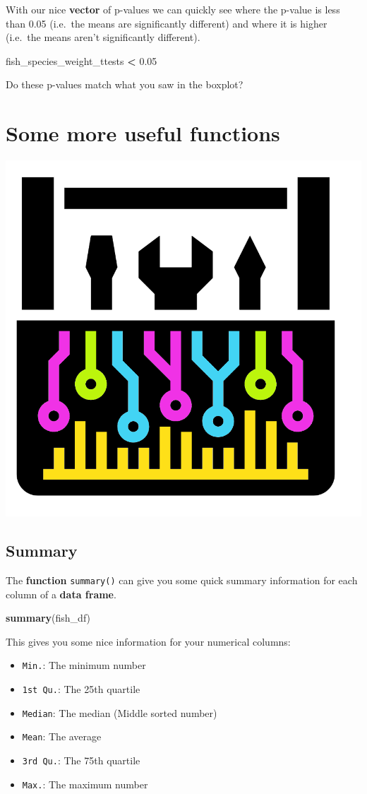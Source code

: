 \documentclass[]{book}
\newenvironment{Shaded}{\begin{snugshade}}{\end{snugshade}}
\newcommand{\KeywordTok}[1]{\textcolor[rgb]{0.13,0.29,0.53}{\textbf{#1}}}
\newcommand{\FloatTok}[1]{\textcolor[rgb]{0.00,0.00,0.81}{#1}}
\newcommand{\StringTok}[1]{\textcolor[rgb]{0.31,0.60,0.02}{#1}}
\newcommand{\OperatorTok}[1]{\textcolor[rgb]{0.81,0.36,0.00}{\textbf{#1}}}
\newcommand{\NormalTok}[1]{#1}
\providecommand{\tightlist}{%
  \setlength{\itemsep}{0pt}\setlength{\parskip}{0pt}}
\begin{document}
With our nice \textbf{vector} of p-values we can quickly see where the
p-value is less than 0.05 (i.e.~the means are significantly different)
and where it is higher (i.e.~the means aren't significantly different).

\begin{Shaded}
\begin{Highlighting}[]
\NormalTok{fish_species_weight_ttests }\OperatorTok{<}\StringTok{ }\FloatTok{0.05}
\end{Highlighting}
\end{Shaded}

Do these p-values match what you saw in the boxplot?

\section{Some more useful functions}\label{some-more-useful-functions}

\begin{center}\includegraphics[width=0.15\linewidth]{figures/r_toolbox} \end{center}

\subsection{Summary}\label{summary}

The \textbf{function} \texttt{summary()} can give you some quick summary
information for each column of a \textbf{data frame}.

\begin{Shaded}
\begin{Highlighting}[]
\KeywordTok{summary}\NormalTok{(fish_df)}
\end{Highlighting}
\end{Shaded}

This gives you some nice information for your numerical columns:

\begin{itemize}
\tightlist
\item
  \texttt{Min.}: The minimum number
\item
  \texttt{1st\ Qu.}: The 25th quartile
\item
  \texttt{Median}: The median (Middle sorted number)
\item
  \texttt{Mean}: The average
\item
  \texttt{3rd\ Qu.}: The 75th quartile
\item
  \texttt{Max.}: The maximum number
\end{itemize}
\end{document}

